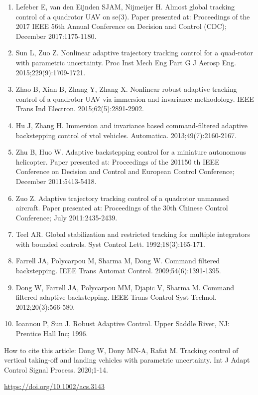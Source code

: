 \documentclass[10pt]{article}
\begin{document}
\begin{enumerate}
  \item Lefeber E, van den Eijnden SJAM, Nijmeijer H. Almost global tracking control of a quadrotor UAV on se(3). Paper presented at: Proceedings of the 2017 IEEE 56th Annual Conference on Decision and Control (CDC); December 2017:1175-1180.

  \item Sun L, Zuo Z. Nonlinear adaptive trajectory tracking control for a quad-rotor with parametric uncertainty. Proc Inst Mech Eng Part G J Aerosp Eng. 2015;229(9):1709-1721.

  \item Zhao B, Xian B, Zhang Y, Zhang X. Nonlinear robust adaptive tracking control of a quadrotor UAV via immersion and invariance methodology. IEEE Trans Ind Electron. 2015;62(5):2891-2902.

  \item Hu J, Zhang $\mathrm{H}$. Immersion and invariance based command-filtered adaptive backstepping control of vtol vehicles. Automatica. 2013;49(7):2160-2167.

  \item Zhu B, Huo W. Adaptive backstepping control for a miniature autonomous helicopter. Paper presented at: Proceedings of the 201150 th IEEE Conference on Decision and Control and European Control Conference; December 2011:5413-5418.

  \item Zuo Z. Adaptive trajectory tracking control of a quadrotor unmanned aircraft. Paper presented at: Proceedings of the 30th Chinese Control Conference; July 2011:2435-2439.

  \item Teel AR. Global stabilization and restricted tracking for multiple integrators with bounded controls. Syst Control Lett. 1992;18(3):165-171.

  \item Farrell JA, Polycarpou M, Sharma M, Dong W. Command filtered backstepping. IEEE Trans Automat Control. 2009;54(6):1391-1395.

  \item Dong W, Farrell JA, Polycarpou MM, Djapic V, Sharma M. Command filtered adaptive backstepping. IEEE Trans Control Syst Technol. 2012;20(3):566-580.

  \item Ioannou P, Sun J. Robust Adaptive Control. Upper Saddle River, NJ: Prentice Hall Inc; 1996.

\end{enumerate}

How to cite this article: Dong W, Dony MN-A, Rafat M. Tracking control of vertical taking-off and landing vehicles with parametric uncertainty. Int J Adapt Control Signal Process. 2020;1-14.

\href{https://doi.org/10.1002/acs.3143}{https://doi.org/10.1002/acs.3143}
\end{document}
